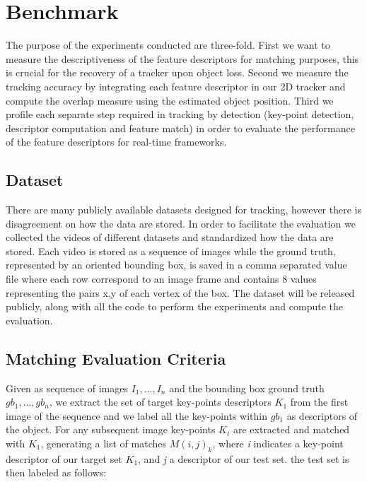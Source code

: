 \section{Benchmark}

The purpose of the experiments conducted are three-fold. First we want to measure the descriptiveness of the feature descriptors for matching purposes, this is crucial for the recovery of a tracker upon object loss. Second we measure the tracking accuracy by integrating each feature descriptor in our 2D tracker and compute the overlap measure using the estimated object position. Third we profile each separate step required in tracking by detection (key-point detection, descriptor computation and feature match) in order to evaluate the performance of the feature descriptors for real-time frameworks.

\subsection{Dataset}


There are many publicly available datasets designed for tracking, however there is disagreement on how the data are stored. In order to facilitate the evaluation we collected the videos of different datasets and standardized how the data are stored. Each video is stored as a sequence of images while the ground truth, represented by an oriented bounding box, is saved in a comma separated value file where each row correspond to an image frame and contains 8 values representing the pairs x,y of each vertex of the box. The dataset will be released publicly, along with all the code to perform the experiments and compute the evaluation.

\subsection{Matching Evaluation Criteria}


Given as sequence of images $I_{1},...,I_{n}$ and the bounding box ground truth $gb_{1},...,gb_{n}$, we extract the set of target key-points descriptors $K_{1}$ from the first image of the sequence and we label all the key-points within $gb_{1}$ as descriptors of the object. For any subsequent image key-points $K_{t}$ are extracted and matched with $K_{1}$, generating a list of matches $M(i,j)_{k}$, where \textit{i} indicates a key-point descriptor of our target set $K_{1}$, and \textit{j} a descriptor of our test set. the test set is then labeled as follows:

